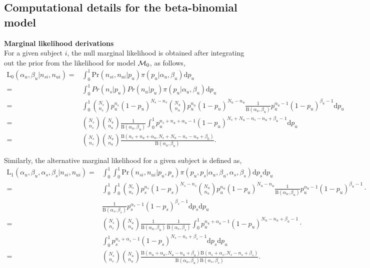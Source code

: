 \documentclass{article}
\begin{document}
\subsection{Computational details for the beta-binomial model}
\noindent\textbf{Marginal likelihood derivations}\\
For a given subject $i$, the null marginal likelihood is obtained after integrating out the prior from the likelihood for model ${\cal M}_0$, as follows,
\[
\begin{split}
\mathrm{L_0}(\alpha_u,\beta_u|n_{si},n_{ui}) =&\int_0^1 \mathrm{Pr}(n_{si},n_{ui}|p_u)\pi(p_u|\alpha_u,\beta_u)\mathrm{d}p_u\\
=& \int_0^1Pr(n_s|p_u)Pr(n_u|p_u)\pi(p_u|\alpha_u,\beta_u) \mathrm{d}p_u\\
=&\int_0^1\binom{N_s}{n_s}p_u^{n_s}(1-p_u)^{N_s-n_s}\binom{N_u}{n_u}p_u^{n_u}(1-p_u)^{N_u-n_u}\frac{1}{\mathrm{B}(\alpha_u,\beta_u)}p_u^{\alpha_u-1}(1-p_u)^{\beta_u-1} \mathrm{d}p_u\\
=&\binom{N_s}{n_s}\binom{N_u}{n_u}\frac{1}{\mathrm{B}(\alpha_u,\beta_u)}\int_0^1 p_u^{n_s+n_u+\alpha_u-1}(1-p_u)^{N_s+N_u-n_s-n_u+\beta_u-1} \mathrm{d}p_u\\
=&\binom{N_s}{n_s}\binom{N_u}{n_u}\frac{\mathrm{B}(n_s+n_u+\alpha_u,N_s+N_u-n_s-n_u+\beta_0)}{\mathrm{B}(\alpha_u,\beta_u)}.
\end{split}
\]


\noindent Similarly, the alternative marginal likelihood for a given subject is defined as,
\[
\begin{split}
\mathrm{L_1}(\alpha_u,\beta_u,\alpha_s,\beta_s|n_{si},n_{ui}) =&\int_0^1\int_0^1 \mathrm{Pr}(n_{si},n_{ui}|p_u,p_s)\pi(p_u,p_s|\alpha_u,\beta_u,\alpha_s,\beta_s)\mathrm{d}p_s\mathrm{d}p_u \\
=&\int_0^1\int_0^1\binom{N_s}{n_s}p_s^{n_s}(1-p_s)^{N_s-n_s}\binom{N_u}{n_u}p_u^{n_u}(1-p_u)^{N_u-n_u}\frac{1}{\mathrm{B}(\alpha_u,\beta_u)}p_u^{\alpha_u-1}(1-p_u)^{\beta_u-1} \cdot\\
&\frac{1}{\mathrm{B}(\alpha_s,\beta_s)}p_s^{\alpha_s-1}(1-p_s)^{\beta_s-1} \mathrm{d}p_s\mathrm{d}p_u\\
=&\binom{N_s}{n_s}\binom{N_u}{n_u}\frac{1}{\mathrm{B}(\alpha_u,\beta_u)}\frac{1}{\mathrm{B}(\alpha_s,\beta_s)}\int_0^1 p_u^{n_u+\alpha_u-1}(1-p_u)^{N_u-n_u+\beta_u-1} \cdot\\
&\int_0^1 p_s^{n_s+\alpha_s-1}(1-p_s)^{N_s-n_s+\beta_s-1}\mathrm{d}p_s\mathrm{d}p_u \\
=&\binom{N_s}{n_s}\binom{N_u}{n_u}\frac{\mathrm{B}(n_u+\alpha_u,N_u-n_u+\beta_u)\mathrm{B}(n_s+\alpha_s,N_s-n_s+\beta_s)}{\mathrm{B}(\alpha_u,\beta_u)\mathrm{B}(\alpha_s,\beta_s)}.
\end{split}
\]
\end{document}
